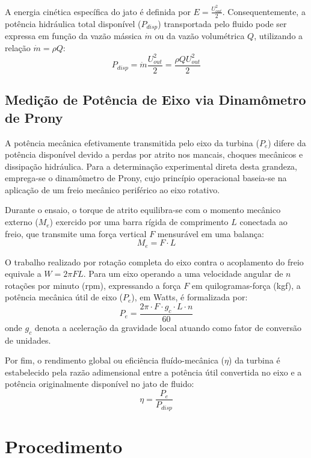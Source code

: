 \documentclass[12pt,a4paper]{article}
\begin{document}
A energia cinética específica do jato é definida por $E = \frac{U_{out}^{2}}{2}$. Consequentemente, a potência hidráulica total disponível ($P_{disp}$) transportada pelo fluido pode ser expressa em função da vazão mássica $\dot{m}$ ou da vazão volumétrica $Q$, utilizando a relação $\dot{m} = \rho Q$:
\begin{equation}
    P_{disp} = \dot{m}\frac{U_{out}^{2}}{2} = \frac{\rho Q U_{out}^{2}}{2}
\end{equation}

\subsection{Medição de Potência de Eixo via Dinamômetro de Prony}
A potência mecânica efetivamente transmitida pelo eixo da turbina ($P_e$) difere da potência disponível devido a perdas por atrito nos mancais, choques mecânicos e dissipação hidráulica. Para a determinação experimental direta desta grandeza, emprega-se o dinamômetro de Prony, cujo princípio operacional baseia-se na aplicação de um freio mecânico periférico ao eixo rotativo.

Durante o ensaio, o torque de atrito equilibra-se com o momento mecânico externo ($M_e$) exercido por uma barra rígida de comprimento $L$ conectada ao freio, que transmite uma força vertical $F$ mensurável em uma balança:
\begin{equation}
    M_e = F \cdot L
\end{equation}

O trabalho realizado por rotação completa do eixo contra o acoplamento do freio equivale a $W = 2\pi FL$. Para um eixo operando a uma velocidade angular de $n$ rotações por minuto (rpm), expressando a força $F$ em quilogramas-força (kgf), a potência mecânica útil de eixo ($P_e$), em Watts, é formalizada por:
\begin{equation}
    P_e = \frac{2\pi \cdot F \cdot g_c \cdot L \cdot n}{60}
\end{equation}
onde $g_c$ denota a aceleração da gravidade local atuando como fator de conversão de unidades. 

Por fim, o rendimento global ou eficiência fluído-mecânica ($\eta$) da turbina é estabelecido pela razão adimensional entre a potência útil convertida no eixo e a potência originalmente disponível no jato de fluido:
\begin{equation}
    \eta = \frac{P_e}{P_{disp}}
\end{equation}

\section{Procedimento}
\end{document}
